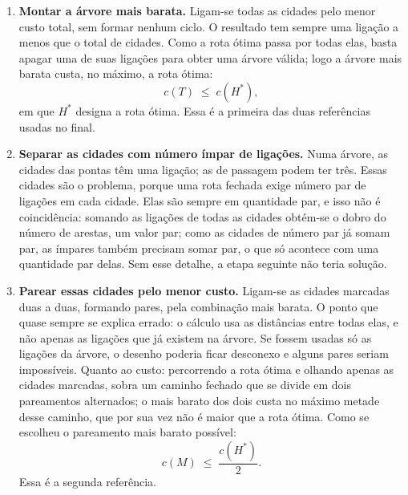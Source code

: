 \begin{enumerate}
	\item \textbf{Montar a árvore mais barata.} Ligam-se todas as cidades pelo
	menor custo total, sem formar nenhum ciclo. O resultado tem sempre uma
	ligação a menos que o total de cidades. Como a rota ótima passa por todas
	elas, basta apagar uma de suas ligações para obter uma árvore válida; logo a
	árvore mais barata custa, no máximo, a rota ótima:
	\begin{equation}
		c(T) \;\leq\; c(H^{*}),
		\label{eq:cota-arvore}
	\end{equation}
	em que $H^{*}$ designa a rota ótima. Essa é a primeira das duas referências
	usadas no final.

	\item \textbf{Separar as cidades com número ímpar de ligações.} Numa árvore,
	as cidades das pontas têm uma ligação; as de passagem podem ter três. Essas
	cidades são o problema, porque uma rota fechada exige número par de ligações
	em cada cidade. Elas são sempre em quantidade par, e isso não é coincidência:
	somando as ligações de todas as cidades obtém-se o dobro do número de
	arestas, um valor par; como as cidades de número par já somam par, as ímpares
	também precisam somar par, o que só acontece com uma quantidade par delas.
	Sem esse detalhe, a etapa seguinte não teria solução.

	\item \textbf{Parear essas cidades pelo menor custo.} Ligam-se as cidades
	marcadas duas a duas, formando pares, pela combinação mais barata. O ponto
	que quase sempre se explica errado: o cálculo usa as distâncias entre todas
	elas, e não apenas as ligações que já existem na árvore. Se fossem usadas só
	as ligações da árvore, o desenho poderia ficar desconexo e alguns pares
	seriam impossíveis. Quanto ao custo: percorrendo a rota ótima e olhando
	apenas as cidades marcadas, sobra um caminho fechado que se divide em dois
	pareamentos alternados; o mais barato dos dois custa no máximo metade desse
	caminho, que por sua vez não é maior que a rota ótima. Como se escolheu o
	pareamento mais barato possível:
	\begin{equation}
		c(M) \;\leq\; \frac{c(H^{*})}{2}.
		\label{eq:cota-pareamento}
	\end{equation}
	Essa é a segunda referência.


\end{enumerate}
